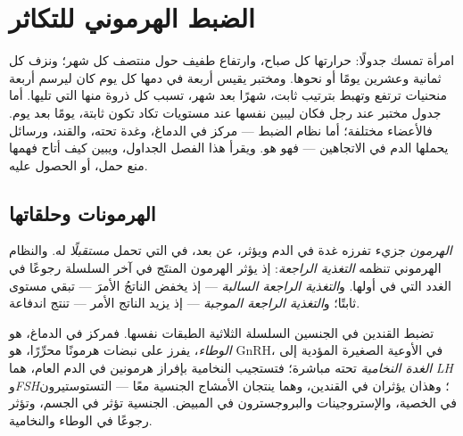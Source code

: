 \chapter{الضبط الهرموني للتكاثر}\label{ch:g11:hormones-and-reproduction}

امرأة تمسك جدولًا: حرارتها كل صباح، وارتفاع طفيف حول منتصف كل شهر؛
ونزف كل ثمانية وعشرين يومًا أو نحوها. ومختبر يقيس أربعة  في
دمها كل يوم كان ليرسم أربعة منحنيات ترتفع وتهبط بترتيب ثابت، شهرًا بعد
شهر، تسبب كل ذروة منها التي تليها. أما جدول مختبر عند رجل فكان ليبين
 نفسها عند مستويات تكاد تكون ثابتة، يومًا بعد يوم. فالأعضاء
مختلفة؛ أما نظام الضبط --- مركز في الدماغ، وغدة تحته، والقند، ورسائل
يحملها الدم في الاتجاهين --- فهو هو. ويقرأ هذا الفصل الجداول، ويبين
كيف أتاح فهمها منع حمل، أو الحصول عليه.

\section{الهرمونات وحلقاتها}

\begin{definition}\label{def:g11:hormones-and-reproduction:hormone}
\emph{الهرمون} جزيء تفرزه غدة في الدم ويؤثر، عن بعد، في
 التي تحمل \emph{مستقبلًا} له. والنظام الهرموني تنظمه
\emph{التغذية الراجعة}: إذ يؤثر الهرمون المنتَج في
آخر السلسلة رجوعًا في الغدد التي في أولها. و\emph{التغذية الراجعة
السالبة} --- إذ يخفض الناتجُ الأمرَ --- تبقي مستوى ثابتًا؛
و\emph{التغذية الراجعة الموجبة} --- إذ يزيد الناتج الأمر --- تنتج
اندفاعة.
\end{definition}

\begin{proposition}\label{prop:g11:hormones-and-reproduction:chain}
تضبط القندين في الجنسين السلسلة الثلاثية الطبقات نفسها. فمركز في
الدماغ، هو \emph{الوطاء}، يفرز على نبضات هرمونًا محرِّرًا، هو GnRH، في
الأوعية الصغيرة المؤدية إلى \emph{الغدة النخامية} تحته مباشرة؛ فتستجيب
النخامية بإفراز هرمونين في الدم العام، هما \emph{LH} و\emph{FSH}؛
وهذان يؤثران في القندين، وهما ينتجان الأمشاج  الجنسية معًا
--- التستوستيرون في الخصية، والإستروجينات والبروجسترون في المبيض.
 الجنسية تؤثر في الجسم، وتؤثر رجوعًا في الوطاء والنخامية.
\end{proposition}
\admitted

